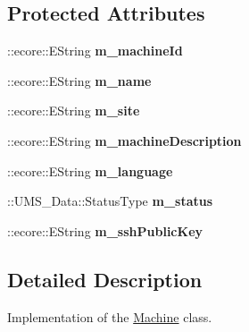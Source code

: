 \subsection*{Protected Attributes}
\begin{DoxyCompactItemize}
\item 
\hypertarget{classUMS__Data_1_1Machine_a8b2b1fe2fdefe822161125f4e1b8f1bb}{
::ecore::EString {\bfseries m\_\-machineId}}
\label{classUMS__Data_1_1Machine_a8b2b1fe2fdefe822161125f4e1b8f1bb}

\item 
\hypertarget{classUMS__Data_1_1Machine_a0a7110e1f21a5a2409e5db7bf36d4f8b}{
::ecore::EString {\bfseries m\_\-name}}
\label{classUMS__Data_1_1Machine_a0a7110e1f21a5a2409e5db7bf36d4f8b}

\item 
\hypertarget{classUMS__Data_1_1Machine_a5b9ed2348f8174368887e2a95d8cbc54}{
::ecore::EString {\bfseries m\_\-site}}
\label{classUMS__Data_1_1Machine_a5b9ed2348f8174368887e2a95d8cbc54}

\item 
\hypertarget{classUMS__Data_1_1Machine_a2884691180fb4c81f80bd1bdbf642448}{
::ecore::EString {\bfseries m\_\-machineDescription}}
\label{classUMS__Data_1_1Machine_a2884691180fb4c81f80bd1bdbf642448}

\item 
\hypertarget{classUMS__Data_1_1Machine_a34191936e38fe4b3fdd92f40e4f2af79}{
::ecore::EString {\bfseries m\_\-language}}
\label{classUMS__Data_1_1Machine_a34191936e38fe4b3fdd92f40e4f2af79}

\item 
\hypertarget{classUMS__Data_1_1Machine_aea676e9d5cba0d8874115e97f2fa738d}{
::UMS\_\-Data::StatusType {\bfseries m\_\-status}}
\label{classUMS__Data_1_1Machine_aea676e9d5cba0d8874115e97f2fa738d}

\item 
\hypertarget{classUMS__Data_1_1Machine_a686fb2520f31cb63076a90dbb16e6785}{
::ecore::EString {\bfseries m\_\-sshPublicKey}}
\label{classUMS__Data_1_1Machine_a686fb2520f31cb63076a90dbb16e6785}

\end{DoxyCompactItemize}


\subsection{Detailed Description}
Implementation of the \hyperlink{classUMS__Data_1_1Machine}{Machine} class. 

